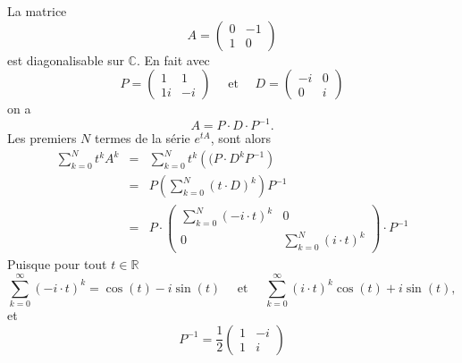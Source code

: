 \begin{example} 
  La matrice
  \begin{displaymath}
    A =
    \begin{pmatrix}
      0 & -1 \\
      1 & 0
    \end{pmatrix} 
  \end{displaymath}
  est diagonalisable sur $ℂ$.  En fait avec
  \begin{displaymath}
    P =  \left(\begin{array}{rr}
                 1 & 1 \\
                 1 i & - i
               \end{array}\right) \quad \text{ et }  \quad
             D = \left(\begin{array}{rr}
                         - i & 0 \\
                         0 &  i
                       \end{array}\right)
  \end{displaymath}
  on a 
  \begin{displaymath}
    A =
    P ⋅ D ⋅ P^{-1}.      
  \end{displaymath}
  Les premiers $N$ termes de la série $e^{tA}$, sont  alors
  \begin{eqnarray*}
    ∑_{k=0}^N t^k A^k  & = & ∑_{k=0}^N t^k \left((P ⋅ D^k P^{-1}\right)  \\
                       & = & P  \left( ∑_{k=0}^N (t⋅ D)^k \right)P^{-1}  \\
                       & =  & P ⋅
                            \begin{pmatrix}
                              \displaystyle ∑_{k=0}^N (-i ⋅t)^k  & 0 \\
                              0 &  \displaystyle ∑_{k=0}^N (i ⋅t)^k 
                            \end{pmatrix} ⋅P^{-1}
  \end{eqnarray*}
  Puisque pour tout $t ∈ ℝ$ 
  \begin{displaymath}
    ∑_{k=0}^∞ (- i ⋅ t )^k =  \cos(t) - i \sin(t)  \quad  \text{ et } \quad  ∑_{k=0}^∞ ( i ⋅ t )^k     \cos(t) + i \sin(t),
  \end{displaymath}
et 
  \begin{displaymath}
    P^{-1}  = \frac{1}{2}
    \begin{pmatrix}
      1 & - i \\
      1 &  i
    \end{pmatrix} 

\end{displaymath}
\end{example}

